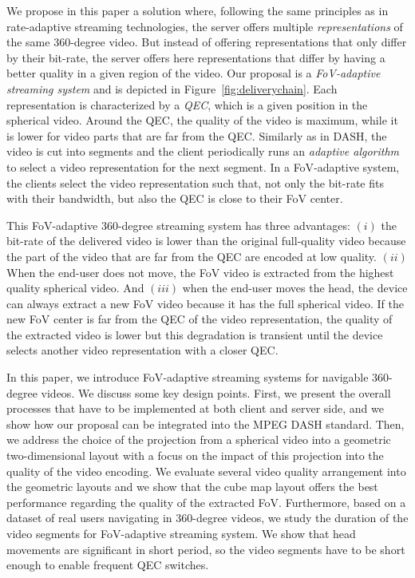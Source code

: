 We propose in this paper a solution where, following the same principles as in
rate-adaptive streaming technologies, the server offers multiple \emph{representations}
of the same 360-degree video. But instead of offering representations that only differ by
their bit-rate, the server offers here representations that differ by 
having a better quality in a given region of the video.
Our proposal is a \emph{FoV-adaptive streaming system} and is depicted in Figure~\ref{fig:deliverychain}.
Each representation is characterized by a \emph{\ac{QEC}}, which is a given
position in the spherical video. Around the \ac{QEC}, the quality of the video is maximum,
while it is lower for video parts that are far from the \ac{QEC}. Similarly as
in \ac{DASH}, the video is cut into segments and the client periodically runs 
an \emph{adaptive algorithm} to select
a video representation for the next segment. In a \ac{FoV}-adaptive system, the clients select
the video representation such that, not only the bit-rate fits with their bandwidth, but also
the \ac{QEC} is close to their \ac{FoV} center.



This \ac{FoV}-adaptive 360-degree streaming system has three advantages:
$(i)$ the bit-rate of the delivered video is lower than the original full-quality video because the 
part of the video that are far from the \ac{QEC} are encoded at low quality.
$(ii)$ When the end-user does not move, the \ac{FoV} video is extracted from the highest
quality spherical video.
And $(iii)$ when the end-user moves the head, the device can
always extract
a new \ac{FoV} video because it has the full spherical video. If the
new \ac{FoV} center is far from the
\ac{QEC} of the video representation, the quality of the extracted video is lower but this
degradation is transient until the
device selects another video representation with a closer \ac{QEC}.

In this paper, we introduce \ac{FoV}-adaptive streaming systems for navigable 360-degree
videos. We discuss some key design points. First, we present the overall processes that have to 
be implemented at both client and server side, and we show how our proposal can be integrated 
into the MPEG \ac{DASH} standard. Then, we address
the choice of the projection from a spherical video into a geometric two-dimensional layout
with a focus on the impact of this projection into the quality of the video encoding. We evaluate
several video quality arrangement into the geometric layouts and we show that the
cube map layout offers the best performance regarding the quality of the extracted
\ac{FoV}.
Furthermore, based on a dataset of
real users navigating in 360-degree videos, we study the duration of the video segments
for \ac{FoV}-adaptive streaming system. We show that head movements are significant
in short period, so the video segments have to be short enough to enable
frequent \ac{QEC} switches.

